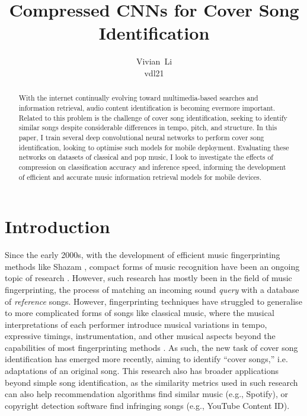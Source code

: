\documentclass{article}
\title{Compressed CNNs for Cover Song Identification}
\author{%
  Vivian~Li \\
  vdl21 \\
}
\begin{document}
\maketitle

\begin{abstract}
    With the internet continually evolving toward multimedia-based searches and information retrieval, audio content identification is becoming evermore important. Related to this problem is the challenge of cover song identification, seeking to identify similar songs despite considerable differences in tempo, pitch, and structure. In this paper, I train several deep convolutional neural networks to perform cover song identification, looking to optimise such models for mobile deployment. Evaluating these networks on datasets of classical and pop music, I look to investigate the effects of compression on classification accuracy and inference speed, informing the development of efficient and accurate music information retrieval models for mobile devices.
\end{abstract}

\section{Introduction}\label{sec:introduction}

Since the early 2000s, with the development of efficient music fingerprinting methods like Shazam \cite{Shazam}, compact forms of music recognition have been an ongoing topic of research \cite{Six2014, Baluja2008, Ramona2013, Sonnleitner2016}. However, such research has mostly been in the field of music fingerprinting, the process of matching an incoming sound \textit{query} with a database of \textit{reference} songs. However, fingerprinting techniques have struggled to generalise to more complicated forms of songs like classical music, where the musical interpretations of each performer introduce musical variations in tempo, expressive timings, instrumentation, and other musical aspects beyond the capabilities of most fingerprinting methods \cite{Arzt2017}. As such, the new task of cover song identification has emerged more recently, aiming to identify ``cover songs,'' i.e. adaptations of an original song. This research also has broader applications beyond simple song identification, as the similarity metrics used in such research can also help recommendation algorithms find similar music (e.g., Spotify), or copyright detection software find infringing songs (e.g., YouTube Content ID).
\end{document}
